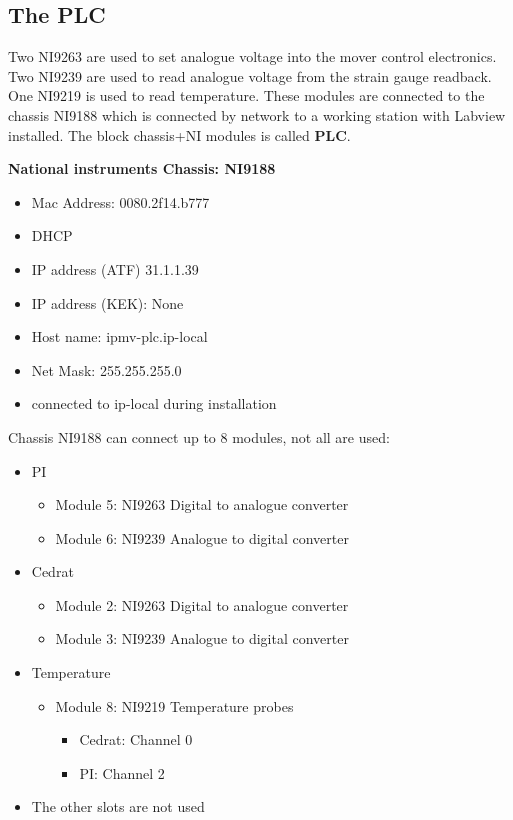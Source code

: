 \subsection{The PLC}
Two NI9263 are used to set analogue voltage into the mover control electronics. Two NI9239 are used to read analogue voltage from the strain gauge readback. One NI9219 is used to read temperature. These modules are connected to the chassis NI9188 which is connected by network to a working station with Labview installed.
The block chassis+NI modules is called \textbf{PLC}.\par
\textbf{National instruments Chassis: NI9188}
\begin{itemize}
\item Mac Address: 0080.2f14.b777
\item DHCP
\item IP address (ATF) 31.1.1.39
\item IP address (KEK): None
\item Host name: ipmv-plc.ip-local
\item Net Mask: 255.255.255.0
\item connected to ip-local during installation
\end{itemize}
Chassis NI9188 can connect up to 8 modules, not all are used:
\begin{itemize}
\item PI
\begin{itemize}
\item Module 5: NI9263 Digital to analogue converter
\item Module 6: NI9239 Analogue to digital converter
\end{itemize}
\item Cedrat
\begin{itemize}
\item Module 2: NI9263 Digital to analogue converter
\item Module 3: NI9239 Analogue to digital converter
\end{itemize}
\item Temperature
\begin{itemize}
\item Module 8: NI9219 Temperature probes
\begin{itemize}
\item Cedrat: 	Channel 0
\item PI: Channel 2
\end{itemize}
\end{itemize}
\item The other slots are not used
\end{itemize}
